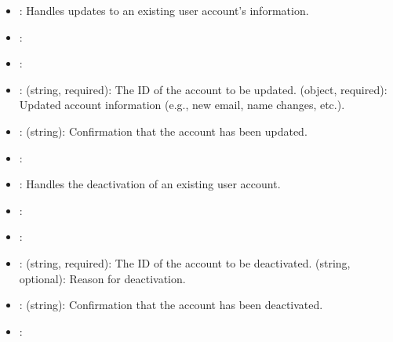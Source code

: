 \documentclass[letterpaper,10pt,english]{sphinxmanual}
\begin{document}
\sphinxAtStartPar
{}
\begin{itemize}
\item {} 
\sphinxAtStartPar
{}: Handles updates to an existing user account’s information.

\item {} 
\sphinxAtStartPar
{}: 

\item {} 
\sphinxAtStartPar
{}: 

\item {} 
\sphinxAtStartPar
{}:
\sphinxhyphen{}  (string, required): The ID of the account to be updated.
\sphinxhyphen{}  (object, required): Updated account information (e.g., new email, name changes, etc.).

\item {} 
\sphinxAtStartPar
{}:
\sphinxhyphen{}  (string): Confirmation that the account has been updated.

\item {} 
\sphinxAtStartPar
{}: 

\end{itemize}

\sphinxAtStartPar
{}
\begin{itemize}
\item {} 
\sphinxAtStartPar
{}: Handles the deactivation of an existing user account.

\item {} 
\sphinxAtStartPar
{}: 

\item {} 
\sphinxAtStartPar
{}: 

\item {} 
\sphinxAtStartPar
{}:
\sphinxhyphen{}  (string, required): The ID of the account to be deactivated.
\sphinxhyphen{}  (string, optional): Reason for deactivation.

\item {} 
\sphinxAtStartPar
{}:
\sphinxhyphen{}  (string): Confirmation that the account has been deactivated.

\item {} 
\sphinxAtStartPar
{}: 

\end{itemize}
\end{document}
